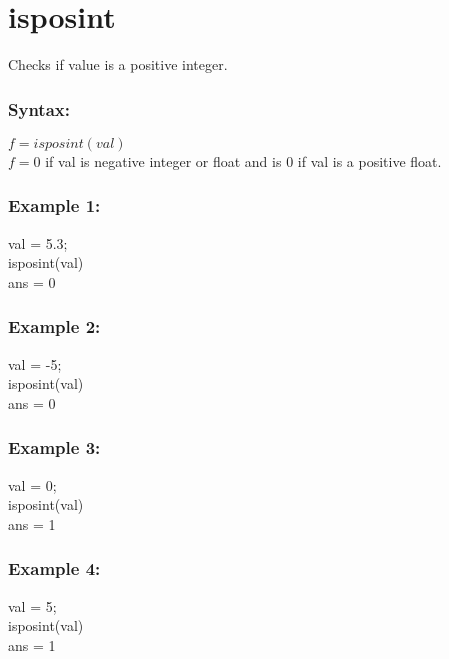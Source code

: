 \section{isposint}
Checks if value is a positive integer.\\

\subsubsection{Syntax:}

$f = isposint(val)$\\
$f = 0$ if val is negative integer or float and is 0 if val is a positive float.\\

\subsubsection{Example 1:}
val = 5.3;\\
isposint(val)\\
ans = 0\\

\subsubsection{Example 2:}
val = -5;\\
isposint(val)\\
ans = 0\\

\subsubsection{Example 3:}
val = 0;\\
isposint(val)\\
ans = 1\\

\subsubsection{Example 4:}
val = 5;\\
isposint(val)\\
ans = 1\\

